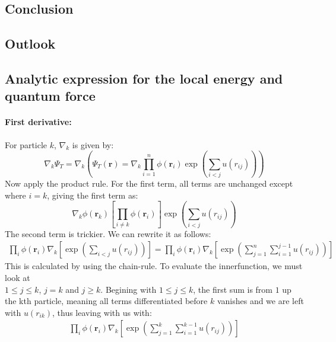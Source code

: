 \documentclass[a4paper, 10pt]{article}
\begin{document}
	\subsection{Conclusion}
	
	\subsection{Outlook}
	
	
	\begin{appendices}
		\section{Analytic expression for the local energy and quantum force}\label{ap:analytic_expression_for_the_local_energy_and_quantum_force}
		\paragraph{First derivative:}
		For particle $k$, $\nabla_k$ is given by:
		\begin{equation}
		\nabla_k\Psi_{T} = \nabla_k\left(\Psi_T(\mathbf{r})=\nabla_k \prod_{i=1}^n\phi(\mathbf{r}_i)\exp\left(\sum_{i<j} u(r_{ij})\right)\right)
		\end{equation}
		Now apply the product rule. For the first term, all terms are unchanged except where $i=k$, giving the first term as:
		\begin{equation}
		\nabla_k \phi(\mathbf{r}_k)\left[ \prod_{i\neq k} \phi(\mathbf{r}_i)\right]\exp\left(\sum_{i<j}u(r_{ij})\right)
		\end{equation}
		The second term is trickier. We can rewrite it as follows:
		\begin{align}
		\prod_{i}\phi(\boldsymbol{r}_{i})\nabla_{k}\left[\exp\left(\sum_{i < j}u(r_{ij})\right)\right]
		= \prod_{i}\phi(\boldsymbol{r}_{i})\nabla_{k}\left[\exp\left(\sum_{j = 1}^{n}\sum_{i = 1}^{j-1}u(r_{ij})\right)\right]
		\label{second term in first derivative}
		\end{align}
		This is calculated by using the chain-rule. To evaluate the innerfunction, we must look
		at \\$1 \le j \le k$, $j = k$ and $j \ge k$. Begining with $1\le  j \le k$,
		the first sum is from $1$ up the kth particle, meaning all terms differentiated before $k$ vanishes
		and we are left with $u(r_{ik})$, thus leaving with us with:
		\begin{align}
		\prod_{i}\phi(\boldsymbol{r}_{i})\nabla_{k}\left[\exp\left(\sum_{j = 1}^{k}\sum_{i = 1}^{k-1}u(r_{ij})\right)\right]

\end{align}
\end{appendices}
\end{document}
